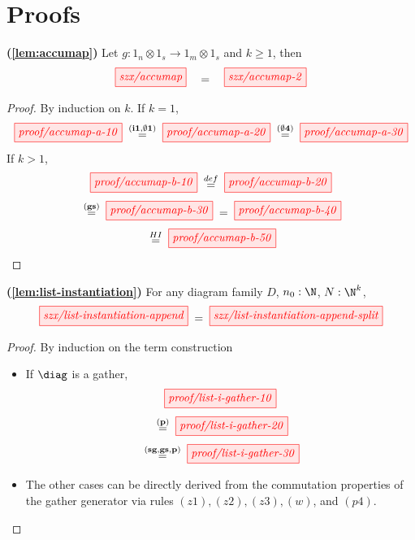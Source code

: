 \section{Proofs}%
\label{sec:proofs}

\begin{lemma}{\!\textbf{(\ref{lem:accumap})}}
    Let $g : 1_n \otimes 1_s \to 1_{m} \otimes 1_s$ and $k\geq 1$, then
    \[
        \tikzfig{szx/accumap}
        \quad=\quad%
        \tikzfig{szx/accumap-2}
    \]
\end{lemma}

\begin{proof}
    By induction on $k$.
    If $k=1$,
    \[
        \tikzfig{proof/accumap-a-10}
        \;\overset{\scriptstyle{\bf{(i1, \emptyset 1)}}}{=}\;
        \tikzfig{proof/accumap-a-20}
        \;\overset{\scriptstyle{\bf{(\emptyset 4)}}}{=}\;
        \tikzfig{proof/accumap-a-30}
    \]
    If $k>1$,
    \[
        \tikzfig{proof/accumap-b-10}
        \;\overset{\scriptstyle{def}}{=}\;
        \tikzfig{proof/accumap-b-20}
    \]
    \[
        \;\overset{\scriptstyle{\bf{(gs)}}}{=}\;
        \tikzfig{proof/accumap-b-30}
        \;=\;
        \tikzfig{proof/accumap-b-40}
    \]
    \[
        \;\overset{\scriptstyle{HI}}{=}\;
        \tikzfig{proof/accumap-b-50}
    \]
\end{proof}

\begin{lemma}{\!\textbf{(\ref{lem:list-instantiation})}}
    For any diagram family $D$, $n_0 : \N$, $N : \N^k$,
    \[
        \tikzfig{szx/list-instantiation-append}
        \;=\;
        \tikzfig{szx/list-instantiation-append-split}
    \]
\end{lemma}

\begin{proof}
    By induction on the term construction
    \begin{itemize}
        \item If $\diag$ is a gather, 
        \[
            \tikzfig{proof/list-i-gather-10}
        \]
        \[
            \;\overset{\scriptstyle{\bf{(p)}}}{=}\;
            \tikzfig{proof/list-i-gather-20}
        \]
        \[
            \;\overset{\scriptstyle{\bf{(sg,gs,p)}}}{=}\;
            \tikzfig{proof/list-i-gather-30}
        \]
        \item The other cases can be directly derived from the commutation properties
        of the gather generator via rules $(z1), (z2), (z3), (w)$, and $(p4)$.
    \end{itemize}
\end{proof}

